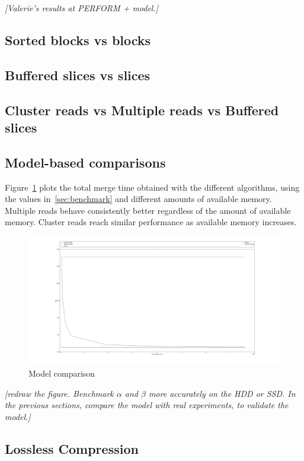 \documentclass[10pt, conference, compsocconf]{IEEEtran}
\newcommand{\todo}[1]{
  \color{red}\emph{[#1]}
  \color{black}
}
\begin{document}
\todo{Valerie's results at PERFORM + model.}

\subsection{Sorted blocks vs blocks}

\subsection{Buffered slices vs slices}


\subsection{Cluster reads vs Multiple reads vs Buffered slices}

\subsection{Model-based comparisons}

Figure~\ref{fig:models} plots the total merge time obtained with the
different algorithms, using the values in~\ref{sec:benchmark} and
different amounts of available memory. Multiple reads behave
consistently better regardless of the amount of available
memory. Cluster reads reach similar performance as available memory
increases.
\begin{figure}
  \includegraphics[width=\columnwidth]{figures/model.pdf}
  \caption{Model comparison}
  \label{fig:models}
\end{figure}
\todo{redraw the figure. Benchmark $\alpha$ and $\beta$ more
  accurately on the HDD or SSD. In the previous sections, compare the
  model with real experiments, to validate the model.}

\subsection{Lossless Compression}
\end{document}
